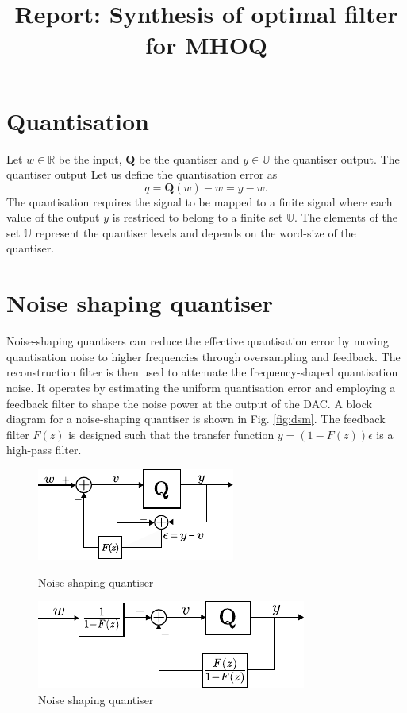 \documentclass[a4paper]{article}
\title{Report: Synthesis of optimal filter for MHOQ}
\begin{document}
\newpage
\maketitle

\section{Quantisation}
Let $w \in \mathbb{R}$ be the input, $\mathbf{Q}$ be the quantiser and $y \in \mathbb{U}$ the quantiser output. The quantiser output 
Let us define the quantisation error as 
\begin{equation}
	q = \mathbf{Q}(w) - w= y -w.
	\label{eq:error}
\end{equation}
The quantisation requires the signal to be mapped to a finite signal where each value of the output $y$ is restriced to belong to a finite set $\mathbb{U}$. The elements of the set $\mathbb{U}$ represent the quantiser levels and depends on the word-size of the quantiser. 

\section{Noise shaping quantiser}
Noise-shaping quantisers can reduce the effective quantisation error by moving quantisation noise to higher 
frequencies through oversampling and feedback.  The reconstruction filter is then used to attenuate the 
frequency-shaped quantisation noise. It operates by estimating the uniform quantisation error and employing a 
feedback filter to shape the noise power at the output of the DAC. A block diagram for a noise-shaping quantiser 
is shown in Fig. \ref{fig:dsm}. The feedback filter $F(z)$ is designed such that the transfer 
function $y = (1 - F(z)) \epsilon$ is a high-pass filter.

\begin{figure}[!h]
	\centering
	\begin{minipage}{0.45\linewidth}
		\centering
		\includegraphics[scale = 1.5]{figures/noise_shaping2.pdf}
		\caption{Noise shaping quantiser}
		\label{Noise-shaping Quantiser }
	\end{minipage}
	\hfil  
	\begin{minipage}{0.45\linewidth}
		\centering
		\includegraphics[scale = 1.5]{figures/noise_shaping_redrawn.pdf}
		\caption{Noise shaping quantiser}
		\label{Noise-shaping Quantiser redrawn }
	\end{minipage}
\end{figure}
\end{document}
